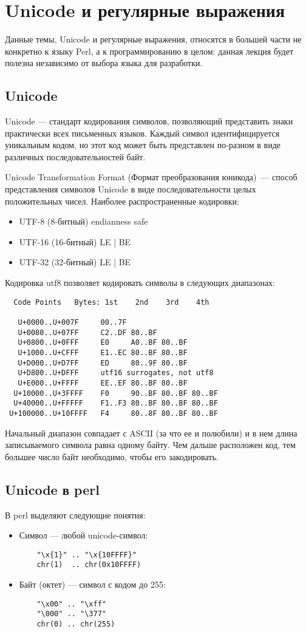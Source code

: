 \setcounter{chapter}{3}
\chapter{Unicode и регулярные выражения}
Данные темы, Unicode и регулярные выражения, относятся в большей части не конкретно к языку Perl, а к программированию в целом: данная лекция будет полезна независимо от выбора языка для разработки.

\section{Unicode} %
Unicode --- стандарт кодирования символов, позволяющий представить знаки практически всех письменных языков. Каждый символ идентифицируется уникальным кодом, но этот код может быть представлен по-разном в виде различных последовательностей байт.

Unicode Transformation Format (Формат преобразования юникода)~--- способ представления символов Unicode в виде последовательности целых положительных чисел. Наиболее распространенные кодировки:
\begin{itemize}
  \item UTF-8 (8-битный) endianness safe
  \item UTF-16 (16-битный) LE | BE
  \item UTF-32 (32-битный) LE | BE
\end{itemize}
Кодировка utf8 позволяет кодировать символы в следующих диапазонах:
\begin{verbatim}
  Code Points   Bytes: 1st    2nd    3rd    4th

   U+0000..U+007F     00..7F
   U+0080..U+07FF     C2..DF 80..BF
   U+0800..U+0FFF     E0     A0..BF 80..BF
   U+1000..U+CFFF     E1..EC 80..BF 80..BF
   U+D000..U+D7FF     ED     80..9F 80..BF
   U+D800..U+DFFF     utf16 surrogates, not utf8
   U+E000..U+FFFF     EE..EF 80..BF 80..BF
  U+10000..U+3FFFF    F0     90..BF 80..BF 80..BF
  U+40000..U+FFFFF    F1..F3 80..BF 80..BF 80..BF
 U+100000..U+10FFFF   F4     80..8F 80..BF 80..BF
\end{verbatim}
Начальный диапазон совпадает с ASCII (за что ее и полюбили) и в нем длина записываемого символа равна одному байту. Чем дальше расположен код, тем большее число байт необходимо, чтобы его закодировать.

\section{Unicode в perl}  %
В perl выделяют следующие понятия:
\begin{itemize}
  \item Символ --- любой unicode-символ:
  \begin{verbatim}
    "\x{1}" .. "\x{10FFFF}"
    chr(1)  .. chr(0x10FFFF)
  \end{verbatim}
  \item Байт (октет) --- символ с кодом до 255:
  \begin{verbatim}
    "\x00" .. "\xff"
    "\000" .. "\377"
    chr(0) .. chr(255)
  \end{verbatim}
\end{itemize}


